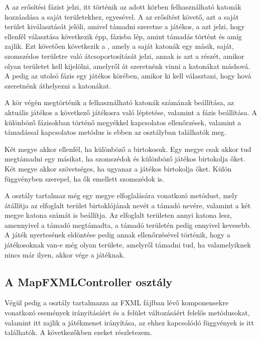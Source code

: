 A  az erősítési fázist jelzi, itt történik az adott körben felhasználható katonák hozzáadása a saját területekhez, egyesével.
A  az erősítést követő, azt a saját terület kiválasztását jelöli, amivel támadni szeretne a játékos, a  azt jelzi, hogy ellenfél választása következik épp,  fázisba lép, amint támadás történt és amíg zajlik.
Ezt követően következik a , amely a saját katonák egy másik, saját, szomszédos területre való átcsoportosítását jelzi, annak is azt a részét, amikor olyan területet kell kijelölni, amelyről át szeretnénk vinni a katonákat máshová.
A  pedig az utolsó fázis egy játékos körében, amikor ki kell választani, hogy hová szeretnénk áthelyezni a katonákat. 

A kör végén megtörténik a felhasználható katonák számának beállítása, az aktuális játékos a következő játékosra való léptetése, valamint a  fázis beállítása.
A különböző fázisokban történő megyékkel kapcsolatos ellenőrzések, valamint a támadással kapcsolatos metódus is ebben az osztályban találhatók meg. 

Két megye akkor ellenfél, ha különböző a birtokosuk.
Egy megye csak akkor tud megtámadni egy másikat, ha szomszédok és különböző játékos birtokolja őket.
Két megye akkor szövetséges, ha ugyanaz a játékos birtokolja őket.
Külön függvényben szerepel, ha ők emellett szomszédok is. 

A  osztály tartalmaz még egy megye elfoglalására vonatkozó metódust, mely átállítja az elfoglalt terület birtoklójának nevét a támadó nevére, valamint a két megye katona számát is beállítja.
Az elfoglalt területen annyi katona lesz, amennyivel a támadó megtámadta, a támadó területén pedig ennyivel kevesebb.
A játék nyertesének eldöntése pedig annak ellenőrzésével történik, hogy a játékosoknak van-e még olyan területe, amelyről támadni tud, ha valamelyiknek nincs már ilyen, akkor vége a játéknak. 

\subsection*{A MapFXMLController osztály}

Végül pedig a  osztály tartalmazza az FXML fájlban lévő komponensekre vonatkozó események irányításáért és a felület változásáért felelős metódusokat, valamint itt zajlik a játékmenet irányítása, az ehhez kapcsolódó függvények is itt találhatók.
A következőkben ezeket részletezem. 

